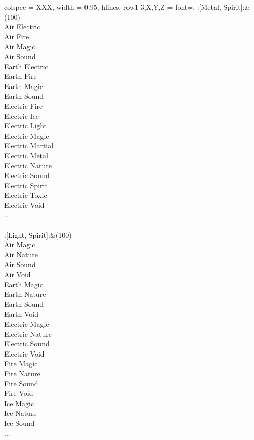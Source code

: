 \begin{longtblr}[
	caption = {2v2 Defending Weak},
	label = {2v2-Defending-Weak},
]{
	colspec = {XXX}, width = 0.95\linewidth,
	hlines,
	row{1-3,X,Y,Z} = {font=\bfseries},
}
	:[Metal, Spirit]:&{(100)\\
	Air Electric \\
	Air Fire \\
	Air Magic \\
	Air Sound \\
	Earth Electric \\
	Earth Fire \\
	Earth Magic \\
	Earth Sound \\
	Electric Fire \\
	Electric Ice \\
	Electric Light \\
	Electric Magic \\
	Electric Martial \\
	Electric Metal \\
	Electric Nature \\
	Electric Sound \\
	Electric Spirit \\
	Electric Toxic \\
	Electric Void \\
	...\\
	}\\

	:[Light, Spirit]:&{(100)\\
	Air Magic \\
	Air Nature \\
	Air Sound \\
	Air Void \\
	Earth Magic \\
	Earth Nature \\
	Earth Sound \\
	Earth Void \\
	Electric Magic \\
	Electric Nature \\
	Electric Sound \\
	Electric Void \\
	Fire Magic \\
	Fire Nature \\
	Fire Sound \\
	Fire Void \\
	Ice Magic \\
	Ice Nature \\
	Ice Sound \\
	...\\
	}\\


\end{longtblr}

